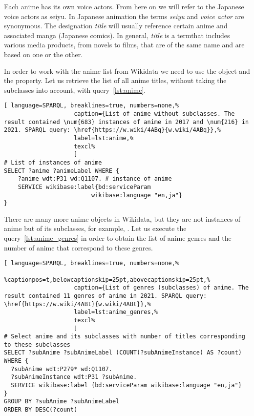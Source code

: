 Each anime has its own voice actors. From here on we will refer to the Japanese voice actors as seiyu. In Japanese animation the terms \emph{seiyu} and \emph{voice actor} are synonymous. The designation \emph{title} will usually reference certain anime and associated manga (Japanese comics). In general, \emph{title} is a termthat includes various media products, from novels to films, that are of the same name and are based on one or the other.

In order to work with the anime list from Wikidata we need to use the  object and the  property. Let us retrieve the list of all anime titles, without taking the subclasses into account, with query~\ref{lst:anime}.

\begin{lstlisting}[ language=SPARQL, breaklines=true, numbers=none,%
                    caption={List of anime without subclasses. The result contained \num{683} instances of anime in 2017 and \num{216} in 2021. SPARQL query: \href{https://w.wiki/4ABq}{w.wiki/4ABq}},%
                    label=lst:anime,%
                    texcl%
                    ]
# List of instances of anime
SELECT ?anime ?animeLabel WHERE {
    ?anime wdt:P31 wd:Q1107. # instance of anime
    SERVICE wikibase:label{bd:serviceParam
					     wikibase:language "en,ja"}
}
\end{lstlisting}%

There are many more anime objects in Wikidata, but they are not instances of anime but of its subclasses, for example, . Let us execute the query~\ref{lst:anime_genres} in order to obtain the list of anime genres and the number of anime that correspond to these genres.

\begin{widepar}%
	\captionsetup[lstlisting]{%
        format=llapwide18 %
	}%
\begin{lstlisting}[ language=SPARQL, breaklines=true, numbers=none,%
                    %captionpos=t,belowcaptionskip=25pt,abovecaptionskip=25pt,%
                    caption={List of genres (subclasses) of anime. The result contained 11 genres of anime in 2021. SPARQL query: \href{https://w.wiki/4ABt}{w.wiki/4ABt}},%
                    label=lst:anime_genres,%
                    texcl%
                    ]
# Select anime and its subclasses with number of titles corresponding to these subclasses
SELECT ?subAnime ?subAnimeLabel (COUNT(?subAnimeInstance) AS ?count) WHERE {
  ?subAnime wdt:P279* wd:Q1107.
  ?subAnimeInstance wdt:P31 ?subAnime.
  SERVICE wikibase:label {bd:serviceParam wikibase:language "en,ja"}
}
GROUP BY ?subAnime ?subAnimeLabel
ORDER BY DESC(?count)
\end{lstlisting}%
\end{widepar}%

